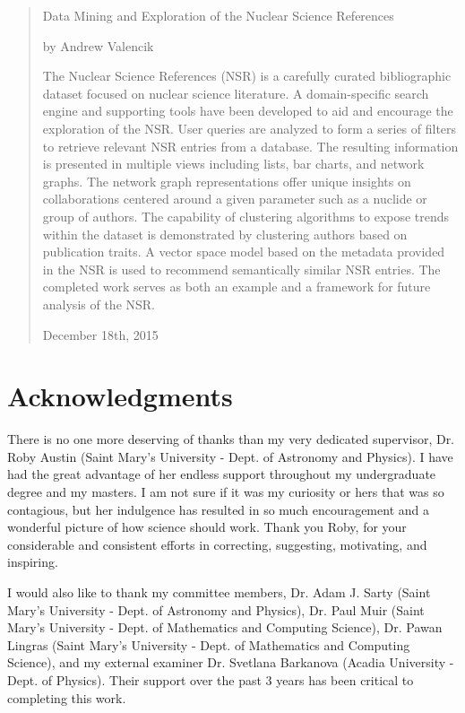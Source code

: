 \thispagestyle{empty} %
\pagebreak
\thispagestyle{empty} %
\begin{abstract}
\large Data Mining and Exploration of the Nuclear Science References

\large by Andrew Valencik

\normalsize
The Nuclear Science References (NSR) is a carefully curated bibliographic dataset focused on nuclear science literature.
A domain-specific search engine and supporting tools have been developed to aid and encourage the exploration of the NSR.
User queries are analyzed to form a series of filters to retrieve relevant NSR entries from a database.
The resulting information is presented in multiple views including lists, bar charts, and network graphs.
The network graph representations offer unique insights on collaborations centered around a given parameter such as a nuclide or group of authors.
The capability of clustering algorithms to expose trends within the dataset is demonstrated by clustering authors based on publication traits.
A vector space model based on the metadata provided in the NSR is used to recommend semantically similar NSR entries.
The completed work serves as both an example and a framework for future analysis of the NSR.

\large December 18th, 2015

\end{abstract}

\section*{Acknowledgments}\label{acknowledgments}
\thispagestyle{empty} %

There is no one more deserving of thanks than my very dedicated supervisor, Dr. Roby Austin (Saint Mary's University - Dept. of Astronomy and Physics).
I have had the great advantage of her endless support throughout my undergraduate degree and my masters.
I am not sure if it was my curiosity or hers that was so contagious, but her indulgence has resulted in so much encouragement and a wonderful picture of how science should work.
Thank you Roby, for your considerable and consistent efforts in correcting, suggesting, motivating, and inspiring.

I would also like to thank my committee members, Dr. Adam J. Sarty (Saint Mary's University - Dept. of Astronomy and Physics), Dr. Paul Muir (Saint Mary's University - Dept. of Mathematics and Computing Science), Dr. Pawan Lingras (Saint Mary's University - Dept. of Mathematics and Computing Science), and my external examiner Dr. Svetlana Barkanova (Acadia University - Dept. of Physics).
Their support over the past 3 years has been critical to completing this work.

